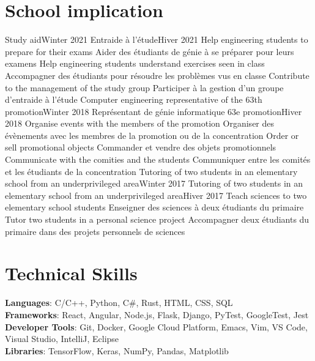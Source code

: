 \documentclass[letterpaper,11pt]{resume}
\begin{document}
\section{School implication}
    \resumeSubHeadingListStart
      \resumeProjectHeadingEnFr
          {Study aid}{Winter 2021}
          {Entraide à l’étude}{Hiver 2021}
          \resumeItemListStart
            \resumeItemEnFr
                {Help engineering students to prepare for their exams}
                {Aider des étudiants de génie à se préparer pour leurs examens}
            \resumeItemEnFr
                {Help engineering students understand exercises seen in class}
                {Accompagner des étudiants pour résoudre les problèmes vus en classe}
            \resumeItemEnFr
                {Contribute to the management of the study group}
                {Participer à la gestion d’un groupe d’entraide à l’étude}
          \resumeItemListEnd
      \resumeProjectHeadingEnFr
          {Computer engineering representative of the 63th promotion}{Winter 2018}
          {Représentant de génie informatique 63e promotion}{Hiver 2018}
          \resumeItemListStart
            \resumeItemEnFr
                {Organise events with the members of the promotion}
                {Organiser des évènements avec les membres de la promotion ou de la concentration}
            \resumeItemEnFr
                {Order or sell promotional objects}
                {Commander et vendre des objets promotionnels}
            \resumeItemEnFr
                {Communicate with the comities and the students}
                {Communiquer entre les comités et les étudiants de la concentration}
          \resumeItemListEnd
      \resumeProjectHeadingEnFr
          {Tutoring of two students in an elementary school from an underprivileged area}{Winter 2017}
          {Tutoring of two students in an elementary school from an underprivileged area}{Hiver 2017}
          \resumeItemListStart
            \resumeItemEnFr
                {Teach sciences to two elementary school students}
                {Enseigner des sciences à deux étudiants du primaire}
            \resumeItemEnFr
                {Tutor two students in a personal science project}
                {Accompagner deux étudiants du primaire dans des projets personnels de sciences}
          \resumeItemListEnd
    \resumeSubHeadingListEnd

%
\section{Technical Skills}
 \begin{itemize}[leftmargin=0.15in, label={}]
    \small{\item{
     \textbf{Languages}{: C/C++, Python, C\#, Rust, HTML, CSS, SQL} \\
     \textbf{Frameworks}{: React, Angular, Node.js, Flask, Django, PyTest, GoogleTest, Jest} \\
     \textbf{Developer Tools}{: Git, Docker, Google Cloud Platform, Emacs, Vim, VS Code, Visual Studio, IntelliJ, Eclipse} \\
     \textbf{Libraries}{: TensorFlow, Keras, NumPy, Pandas, Matplotlib}
    }}
 \end{itemize}


\end{document}
